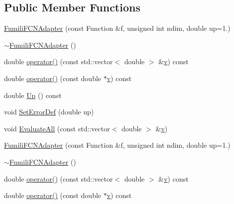 \subsection*{Public Member Functions}
\begin{DoxyCompactItemize}
\item 
\mbox{\hyperlink{classROOT_1_1Minuit2_1_1FumiliFCNAdapter_a86273eee185e8728ef9bfa5c89bdd621}{Fumili\+F\+C\+N\+Adapter}} (const Function \&f, unsigned int ndim, double up=1.)
\item 
\mbox{\hyperlink{classROOT_1_1Minuit2_1_1FumiliFCNAdapter_ab6c007ce98fb307fc026a52832c39313}{$\sim$\+Fumili\+F\+C\+N\+Adapter}} ()
\item 
double \mbox{\hyperlink{classROOT_1_1Minuit2_1_1FumiliFCNAdapter_a7381e9f93fbec9e0504e3e340c281056}{operator()}} (const std\+::vector$<$ double $>$ \&\mbox{\hyperlink{hadron__timeslice_8cc_a716fc87f5e814be3ceee2405ed6ff22a}{v}}) const
\item 
double \mbox{\hyperlink{classROOT_1_1Minuit2_1_1FumiliFCNAdapter_a0e1a10d68960c681ab3e4d5af5c1018b}{operator()}} (const double $\ast$\mbox{\hyperlink{hadron__timeslice_8cc_a716fc87f5e814be3ceee2405ed6ff22a}{v}}) const
\item 
double \mbox{\hyperlink{classROOT_1_1Minuit2_1_1FumiliFCNAdapter_aeed5b77f0bcca4854a9e6b0620ab3cb9}{Up}} () const
\item 
void \mbox{\hyperlink{classROOT_1_1Minuit2_1_1FumiliFCNAdapter_a4c854e9ce5324ee557f818ecf5f00fb1}{Set\+Error\+Def}} (double up)
\item 
void \mbox{\hyperlink{classROOT_1_1Minuit2_1_1FumiliFCNAdapter_a75bacae09c510900a45ea753afae971a}{Evaluate\+All}} (const std\+::vector$<$ double $>$ \&\mbox{\hyperlink{hadron__timeslice_8cc_a716fc87f5e814be3ceee2405ed6ff22a}{v}})
\item 
\mbox{\hyperlink{classROOT_1_1Minuit2_1_1FumiliFCNAdapter_a86273eee185e8728ef9bfa5c89bdd621}{Fumili\+F\+C\+N\+Adapter}} (const Function \&f, unsigned int ndim, double up=1.)
\item 
\mbox{\hyperlink{classROOT_1_1Minuit2_1_1FumiliFCNAdapter_ab6c007ce98fb307fc026a52832c39313}{$\sim$\+Fumili\+F\+C\+N\+Adapter}} ()
\item 
double \mbox{\hyperlink{classROOT_1_1Minuit2_1_1FumiliFCNAdapter_a7381e9f93fbec9e0504e3e340c281056}{operator()}} (const std\+::vector$<$ double $>$ \&\mbox{\hyperlink{hadron__timeslice_8cc_a716fc87f5e814be3ceee2405ed6ff22a}{v}}) const
\item 
double \mbox{\hyperlink{classROOT_1_1Minuit2_1_1FumiliFCNAdapter_a0e1a10d68960c681ab3e4d5af5c1018b}{operator()}} (const double $\ast$\mbox{\hyperlink{hadron__timeslice_8cc_a716fc87f5e814be3ceee2405ed6ff22a}{v}}) const

\end{DoxyCompactItemize}
